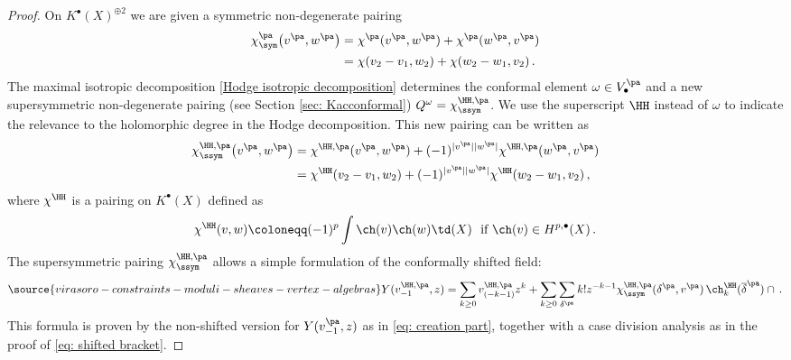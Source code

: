 \begin{proof}
On $K^\bullet(X)^{\oplus 2}$ we are given a symmetric non-degenerate pairing
\begin{align*}
    \chi^{\pa}_{\sym}\big(v^{\pa},w^{\pa}\big)&=\chi^{\pa}(v^{\pa},w^{\pa})+\chi^{\pa}(w^{\pa},v^{\pa})\\
    &=\chi(v_2-v_1,w_2)+\chi(w_2-w_1,v_2)\,.
\end{align*}
The maximal isotropic decomposition \eqref{Hodge isotropic decomposition} determines the conformal element $\omega\in V^{\pa}_\bullet$ and a new supersymmetric non-degenerate pairing (see Section \ref{sec: Kacconformal}) $Q^\omega=\chi^{\HH,\pa}_{\ssym}$. We use the superscript $\HH$ instead of $\omega$ to indicate the relevance to the holomorphic degree in the Hodge decomposition. This new pairing can be written as
\begin{align*}
    \chi^{\HH,\pa}_{\ssym}\big(v^{\pa},w^{\pa}\big)&=\chi^{\HH,\pa}(v^{\pa},w^{\pa})+(-1)^{|v^{\pa}||w^{\pa}|}\chi^{\HH,\pa}(w^{\pa},v^{\pa})\\
    &=\chi^\HH(v_2-v_1,w_2)+(-1)^{|v^{\pa}||w^{\pa}|}\chi^\HH(w_2-w_1,v_2)\,,
\end{align*}
where $\chi^\HH$ is a pairing on $K^\bullet(X)$ defined as
$$\chi^\HH(v,w)\coloneqq (-1)^p\int \ch(v)\ch(w)\td(X)\ \ \textnormal{if}\ \ch(v)\in H^{p,\bullet}(X)\,.
$$
The supersymmetric pairing $\chi^{\HH,\pa}_{\ssym}$ allows a simple formulation of the conformally shifted field:
\begin{equation}\label{eq: shifted field}
\source{virasoro-constraints-moduli-sheaves-vertex-algebras}
    Y(v_{-1}^{\HH,\pa},z)
    =\sum_{k\geq 0} v^{\HH,\pa}_{(-k-1)}z^k+\sum_{k\geq 0}\sum_{\delta^{\pa}}k!z^{-k-1}\chi^{\HH,\pa}_{\ssym}(\delta^{\pa},v^{\pa})\,\ch_{k}^\HH(\overline{\delta}^{\pa})\cap\,.
\end{equation}
This formula is proven by the non-shifted version for $Y(v_{-1}^{\pa},z)$ as in \eqref{eq: creation part}, together with a case division analysis as in the proof of \eqref{eq: shifted bracket}.


\end{proof}
